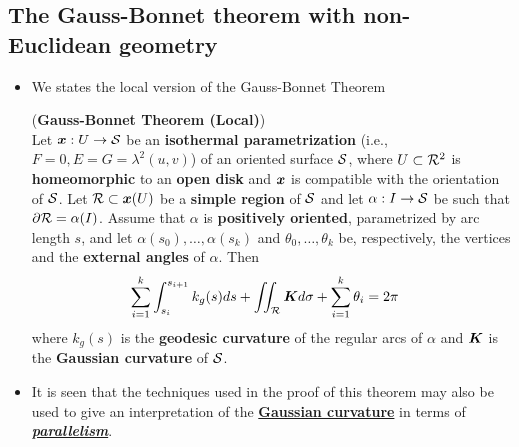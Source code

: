 \documentclass[11pt]{article}
\begin{document}
\subsection{The Gauss-Bonnet theorem with non-Euclidean geometry}
\begin{itemize}
\item We states the local version of the Gauss-Bonnet Theorem
\begin{theorem}\label{thm: gauss_bonnet_local}  (\textbf{Gauss-Bonnet Theorem (Local)}) \citep{do1976differential}\\
Let $\boldsymbol{x}: U \rightarrow {\mathcal S}$ be an \textbf{isothermal parametrization} (i.e., $F = 0, E = G = \lambda^2(u, v)$) of an oriented surface ${\mathcal S}$, where $U \subset {\mathcal R}^2$ is \textbf{homeomorphic} to an \textbf{open disk} and $\boldsymbol{x}$ is compatible with the orientation of ${\mathcal S}$. Let ${\mathcal R} \subset \boldsymbol{x}(U)$ be a \textbf{simple region} of ${\mathcal S}$ and let $\alpha: I \rightarrow {\mathcal S}$ be such that  $\partial {\mathcal R} = \alpha(I)$. Assume that $\alpha$ is \textbf{positively oriented}, parametrized by arc length $s$, and let $\alpha(s_0),\ldots, \alpha(s_k)$ and $\theta_0,\ldots,\theta_k$ be, respectively, the vertices and the \textbf{external angles} of $\alpha$. Then
\begin{align}
\sum_{i=1}^{k}\int_{s_{i}}^{s_{i+1}}k_{g}(s)ds + \iint_{{\mathcal R}}\boldsymbol{K}d\sigma + \sum_{i=1}^{k}\theta_{i} &= 2\pi \label{eqn: gauss_bonnet}
\end{align} where $k_g(s)$ is the \textbf{geodesic curvature} of the regular arcs of $\alpha$ and $\boldsymbol{K}$ is the
\textbf{Gaussian curvature} of ${\mathcal S}$.
\end{theorem}

\item \begin{remark}
It is seen that the techniques used in the proof of this theorem may also be used to give an interpretation of the \underline{\textbf{Gaussian curvature}} in terms of \underline{\emph{\textbf{parallelism}}}. 


\end{remark}
\end{itemize}
\end{document}
